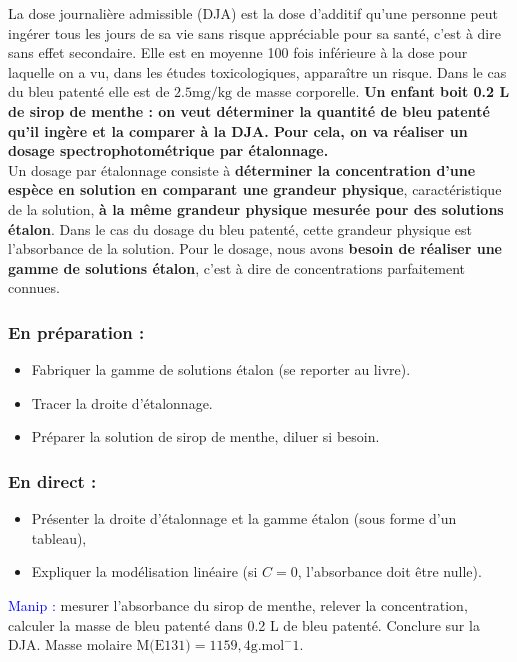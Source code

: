 \documentclass[11pt,a4paper]{report}
\begin{document}
La dose journalière admissible (DJA) est la dose d'additif qu'une personne peut ingérer tous les jours de sa vie sans risque appréciable pour sa santé, c'est à dire sans effet secondaire. Elle est en moyenne 100 fois inférieure à la dose pour laquelle on a vu, dans les études toxicologiques, apparaître un risque. Dans le cas du bleu patenté elle est de $2.5 \text{mg}/\text{kg}$ de masse corporelle. \textbf{Un enfant boit 0.2 L de sirop de menthe : on veut déterminer la quantité de bleu patenté qu'il ingère et la comparer à la DJA. Pour cela, on va réaliser un dosage spectrophotométrique par étalonnage.}\\

Un dosage par étalonnage consiste à \textbf{déterminer la concentration d'une espèce en solution en comparant une grandeur physique}, caractéristique de la solution, \textbf{à la même grandeur physique mesurée pour des solutions étalon}. Dans le cas du dosage du bleu patenté, cette grandeur physique est l'absorbance de la solution. Pour le dosage, nous avons \textbf{besoin de réaliser une gamme de solutions étalon}, c'est à dire de concentrations parfaitement connues.

\subsubsection*{En préparation :}
\begin{itemize}
	\item Fabriquer la gamme de solutions étalon (se reporter au livre).
	\item Tracer la droite d'étalonnage.
	\item Préparer la solution de sirop de menthe, diluer si besoin.
\end{itemize}

\subsubsection*{En direct :}
\begin{itemize}
	\item Présenter la droite d'étalonnage et la gamme étalon (sous forme d'un tableau),
	\item Expliquer la modélisation linéaire (si $C = 0$, l'absorbance doit être nulle).\\
\end{itemize}  

\textcolor{blue}{Manip :} mesurer l'absorbance du sirop de menthe, relever la concentration, calculer la masse de bleu patenté dans 0.2 L de bleu patenté. Conclure sur la DJA.
Masse molaire $\text{M(E131)} = 1159,4 \text{g}.\text{mol}^-1$.\\
\end{document}
